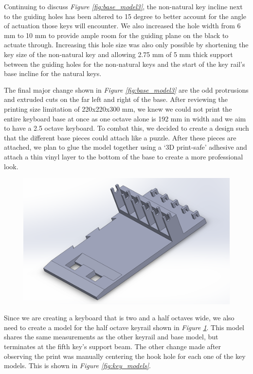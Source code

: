 Continuing to discuss \textit{Figure \ref{fig:base_model3}}, the non-natural key incline next to the guiding holes has been altered to 15 degree to better account for the angle of actuation those keys will encounter. We also increased the hole width from 6 mm to 10 mm to provide ample room for the guiding plane on the black to actuate through. Increasing this hole size was also only possible by shortening the key size of the non-natural key and allowing 2.75 mm of 5 mm thick support between the guiding holes for the non-natural keys and the start of the key rail’s base incline for the natural keys.

The final major change shown in \textit{Figure \ref{fig:base_model3}} are the odd protrusions and extruded cuts on the far left and right of the base. After reviewing the printing size limitation of 220x220x300 mm, we knew we could not print the entire keyboard base at once as one octave alone is 192 mm in width and we aim to have a 2.5 octave keyboard. To combat this, we decided to create a design such that the different base pieces could attach like a puzzle. After these pieces are attached, we plan to glue the model together using a ‘3D print-safe’ adhesive and attach a thin vinyl layer to the bottom of the base to create a more professional look.

\begin{figure}[h!]
  \centering
  \includegraphics[width=0.8\linewidth]{image/BaseModel4.png}
  \caption{}
  \label{fig:base_model4}
\end{figure}

Since we are creating a keyboard that is two and a half octaves wide, we also need to create a model for the half octave keyrail shown in \textit{Figure \ref{fig:base_model4}}. This model shares the same measurements as the other keyrail and base model, but terminates at the fifth key’s support beam.
The other change made after observing the print was manually centering the hook hole for each one of the key models. This is shown in \textit{Figure \ref{fig:key_models}}.

